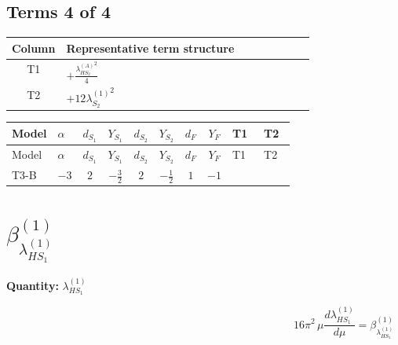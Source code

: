 \documentclass[8pt]{article}
\begin{document}
\begin{landscape}
\subsection*{Terms 4 of 4}
\begin{center}
\begin{tabular}{@{}c >{\raggedright\arraybackslash}p{0.82\linewidth}@{}}
\toprule
Column & Representative term structure \\
\midrule
T1 & \(\displaystyle +\frac{{\lambda_{HS_2}^{(A)}}^2}{4}\) \\
\midrule
T2 & \(\displaystyle +12 {\lambda_{S_2}^{(1)}}^2\) \\
\midrule
\bottomrule
\end{tabular}
\end{center}
\smallskip
\tiny
\begin{longtable}{@{}llcccccc >{\raggedright\arraybackslash}p{0.21\linewidth} >{\raggedright\arraybackslash}p{0.21\linewidth}@{}}
\toprule
Model & $\alpha$ & $d_{S_1}$ & $Y_{S_1}$ & $d_{S_2}$ & $Y_{S_2}$ & $d_F$ & $Y_F$ & T1 & T2 \\
\midrule
\endfirsthead
\toprule
Model & $\alpha$ & $d_{S_1}$ & $Y_{S_1}$ & $d_{S_2}$ & $Y_{S_2}$ & $d_F$ & $Y_F$ & T1 & T2 \\
\midrule
\endhead
T3-B & $-3$ & $2$ & $-\frac{3}{2}$ & $2$ & $-\frac{1}{2}$ & $1$ & $-1$ & \scriptsize\adjustbox{max width=\linewidth}{$\begin{gathered} +\frac{{\lambda_{HS_2}^{(A)}}^2}{4}\end{gathered}$} & \scriptsize\adjustbox{max width=\linewidth}{$\begin{gathered} +12 {\lambda_{S_2}^{(1)}}^2\end{gathered}$} \\
\midrule
\bottomrule
\end{longtable}
\clearpage
\section*{$\beta_{\lambda_{HS_1}^{(1)}}^{(1)}$}
\noindent\textbf{Quantity: }$\lambda_{HS_1}^{(1)}$\par\smallskip
\[16\pi^2\,\mu\frac{d \lambda_{HS_1}^{(1)}}{d\mu}=\beta_{\lambda_{HS_1}^{(1)}}^{(1)}\]

\end{landscape}
\end{document}
